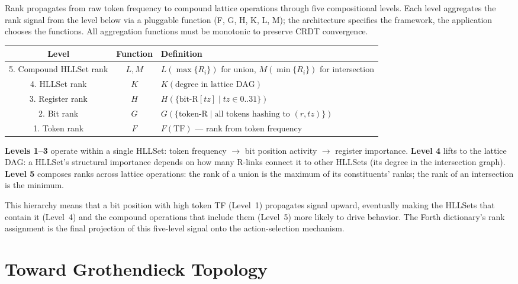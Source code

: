\documentclass[11pt,a4paper]{article}
\theoremstyle{remark}
\begin{document}
Rank propagates from raw token frequency to compound lattice operations through five
compositional levels.  Each level aggregates the rank signal from the level below via
a pluggable function (F, G, H, K, L, M); the architecture specifies the framework,
the application chooses the functions.  All aggregation functions must be monotonic
to preserve CRDT convergence.

\begin{center}
\begin{tabular}{@{}ccl@{}}
\toprule
\textbf{Level} & \textbf{Function} & \textbf{Definition} \\
\midrule
5. Compound HLLSet rank & $L, M$ & $L(\max\{R_i\})$ for union,
                                    $M(\min\{R_i\})$ for intersection \\
4. HLLSet rank           & $K$     & $K(\text{degree in lattice DAG})$ \\
3. Register rank         & $H$     & $H(\{\text{bit-R}[tz] \mid tz \in 0..31\})$ \\
2. Bit rank              & $G$     & $G(\{\text{token-R} \mid \text{all tokens hashing to }(r, tz)\})$ \\
1. Token rank            & $F$     & $F(\text{TF})$ --- rank from token frequency \\
\bottomrule
\end{tabular}
\end{center}

\textbf{Levels 1--3} operate within a single HLLSet: token frequency $\to$ bit
position activity $\to$ register importance.  \textbf{Level 4} lifts to the lattice
DAG: a HLLSet's structural importance depends on how many R-links connect it to other
HLLSets (its degree in the intersection graph).  \textbf{Level 5} composes ranks
across lattice operations: the rank of a union is the maximum of its constituents'
ranks; the rank of an intersection is the minimum.

This hierarchy means that a bit position with high token TF (Level~1) propagates
signal upward, eventually making the HLLSets that contain it (Level~4) and the
compound operations that include them (Level~5) more likely to drive behavior.  The
Forth dictionary's rank assignment is the final projection of this five-level signal
onto the action-selection mechanism.

\section{Toward Grothendieck Topology}
\label{sec:gt}
\end{document}
